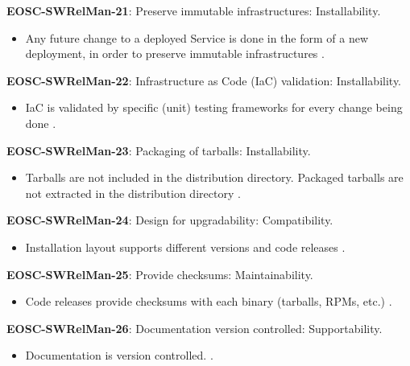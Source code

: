 \textbf{EOSC-SWRelMan-21}: Preserve immutable infrastructures: Installability.

\begin{itemize}
    \item Any future change to a deployed Service is done in the form of a new deployment, in order to preserve immutable infrastructures \cite{orviz_fernandez_eosc-synergy_2020}.
\end{itemize}

\textbf{EOSC-SWRelMan-22}: Infrastructure as Code (IaC) validation: Installability.

\begin{itemize}
    \item IaC is validated by specific (unit) testing frameworks for every change being done \cite{orviz_fernandez_eosc-synergy_2020}.
\end{itemize}

\textbf{EOSC-SWRelMan-23}: Packaging of tarballs: Installability.

\begin{itemize}
    \item Tarballs are not included in the distribution directory. Packaged tarballs are not extracted in the distribution directory \cite{raymond_software_2013}.
\end{itemize}

\textbf{EOSC-SWRelMan-24}: Design for upgradability: Compatibility.

\begin{itemize}
    \item Installation layout supports different versions and code releases \cite{raymond_software_2013}.
\end{itemize}

\textbf{EOSC-SWRelMan-25}: Provide checksums: Maintainability.

\begin{itemize}
    \item Code releases provide checksums with each binary (tarballs, RPMs, etc.) \cite{raymond_software_2013}.
\end{itemize}

\textbf{EOSC-SWRelMan-26}: Documentation version controlled: Supportability.

\begin{itemize}
    \item Documentation is version controlled. \cite{orviz_fernandez_eosc-synergy_2020}.
\end{itemize}

